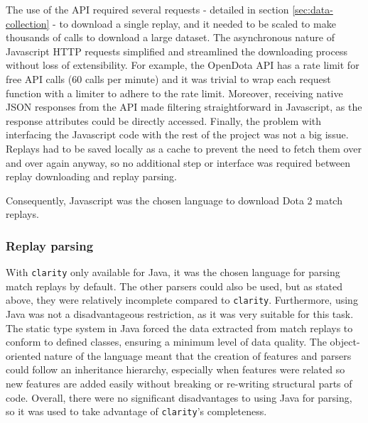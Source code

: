 \documentclass[Report.tex]{subfiles}
\begin{document}
The use of the API required several requests - detailed in section \ref{sec:data-collection} - to download a single replay, and it needed to be scaled to make thousands of calls to download a large dataset. The asynchronous nature of Javascript HTTP requests simplified and streamlined the downloading process without loss of extensibility. For example, the OpenDota API has a rate limit for free API calls (60 calls per minute) and it was trivial to wrap each request function with a limiter to adhere to the rate limit. Moreover, receiving native JSON responses from the API made filtering straightforward in Javascript, as the response attributes could be directly accessed. Finally, the problem with interfacing the Javascript code with the rest of the project was not a big issue. Replays had to be saved locally as a cache to prevent the need to fetch them over and over again anyway, so no additional step or interface was required between replay downloading and replay parsing. 

Consequently, Javascript was the chosen language to download Dota 2 match replays. 

\subsubsection{Replay parsing}
With \texttt{clarity} only available for Java, it was the chosen language for parsing match replays by default. The other parsers could also be used, but as stated above, they were relatively incomplete compared to \texttt{clarity}. Furthermore, using Java was not a disadvantageous restriction, as it was very suitable for this task. The static type system in Java forced the data extracted from match replays to conform to defined classes, ensuring a minimum level of data quality. The object-oriented nature of the language meant that the creation of features and parsers could follow an inheritance hierarchy, especially when features were related so new features are added easily without breaking or re-writing structural parts of code. Overall, there were no significant disadvantages to using Java for parsing, so it was used to take advantage of \texttt{clarity}'s completeness.
\end{document}
